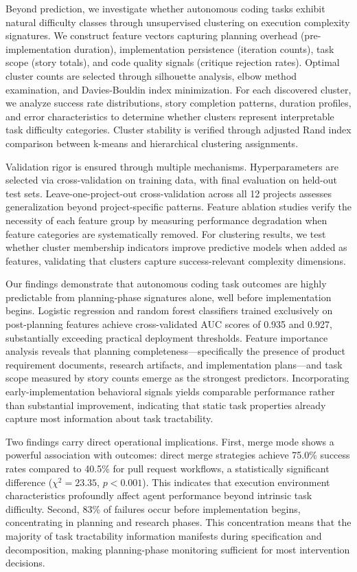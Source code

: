 \documentclass[]{article}
\begin{document}
Beyond prediction, we investigate whether autonomous coding tasks exhibit natural difficulty classes through unsupervised clustering on execution complexity signatures. We construct feature vectors capturing planning overhead (pre-implementation duration), implementation persistence (iteration counts), task scope (story totals), and code quality signals (critique rejection rates). Optimal cluster counts are selected through silhouette analysis, elbow method examination, and Davies-Bouldin index minimization. For each discovered cluster, we analyze success rate distributions, story completion patterns, duration profiles, and error characteristics to determine whether clusters represent interpretable task difficulty categories. Cluster stability is verified through adjusted Rand index comparison between k-means and hierarchical clustering assignments.

Validation rigor is ensured through multiple mechanisms. Hyperparameters are selected via cross-validation on training data, with final evaluation on held-out test sets. Leave-one-project-out cross-validation across all 12 projects assesses generalization beyond project-specific patterns. Feature ablation studies verify the necessity of each feature group by measuring performance degradation when feature categories are systematically removed. For clustering results, we test whether cluster membership indicators improve predictive models when added as features, validating that clusters capture success-relevant complexity dimensions.

Our findings demonstrate that autonomous coding task outcomes are highly predictable from planning-phase signatures alone, well before implementation begins. Logistic regression and random forest classifiers trained exclusively on post-planning features achieve cross-validated AUC scores of 0.935 and 0.927, substantially exceeding practical deployment thresholds. Feature importance analysis reveals that planning completeness—specifically the presence of product requirement documents, research artifacts, and implementation plans—and task scope measured by story counts emerge as the strongest predictors. Incorporating early-implementation behavioral signals yields comparable performance rather than substantial improvement, indicating that static task properties already capture most information about task tractability.

Two findings carry direct operational implications. First, merge mode shows a powerful association with outcomes: direct merge strategies achieve 75.0\% success rates compared to 40.5\% for pull request workflows, a statistically significant difference ($\chi^2 = 23.35$, $p < 0.001$). This indicates that execution environment characteristics profoundly affect agent performance beyond intrinsic task difficulty. Second, 83\% of failures occur before implementation begins, concentrating in planning and research phases. This concentration means that the majority of task tractability information manifests during specification and decomposition, making planning-phase monitoring sufficient for most intervention decisions.
\end{document}
